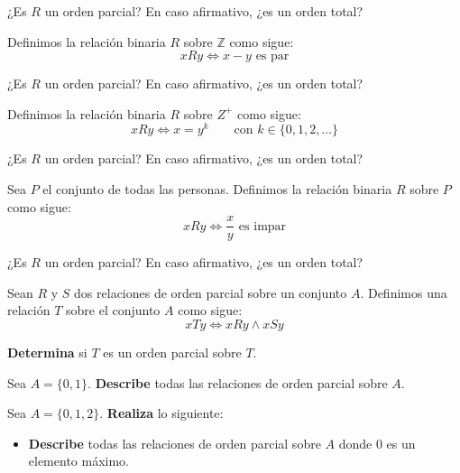 \documentclass[oneside]{style}
\begin{document}
\begin{questions}[label=\protect\circled{\bfseries\arabic*}]
{        ¿Es $R$ un orden parcial? En caso afirmativo, ¿es un orden total?
    }

    \question
    {
        Definimos la relación binaria $R$ sobre $\mathbb{Z}$ como sigue:
        \begin{equation*}
            xRy \Leftrightarrow x-y \text{ es par}
        \end{equation*}

        ¿Es $R$ un orden parcial? En caso afirmativo, ¿es un orden total?
    }

    \question
    {
        Definimos la relación binaria $R$ sobre $Z^+$ como sigue:
        \begin{equation*}
            xRy \Leftrightarrow x = y^k \quad \quad \text{con }
            k \in \{0,1,2,\ldots\}
        \end{equation*}

        ¿Es $R$ un orden parcial? En caso afirmativo, ¿es un orden total?
    }

    \question
    {
        Sea $P$ el conjunto de todas las personas. Definimos la relación 
        binaria $R$ sobre $P$ como  sigue:
        \begin{equation*}
            xRy \Leftrightarrow \frac{x}{y} \text{ es impar}
        \end{equation*}

        ¿Es $R$ un orden parcial? En caso afirmativo, ¿es un orden total?
    }

    \question
    {
        Sean $R$ y $S$ dos relaciones de orden parcial sobre un conjunto $A$.
        Definimos una relación $T$ sobre el conjunto $A$ como sigue:
        \begin{equation*}
            xTy \Leftrightarrow xRy \land xSy 
        \end{equation*} 

        \textbf{Determina} si $T$ es un orden parcial sobre $T$. 
    }

    \question
    {
        Sea $A = \{0,1\}$. \textbf{Describe} todas las relaciones de orden 
        parcial sobre $A$. 
    }

    \question 
    {
        Sea $A = \{0,1,2\}$. \textbf{Realiza} lo siguiente:
        \begin{itemize}
            \item \textbf{Describe} todas las relaciones de orden parcial sobre 
            $A$ donde $0$ es un elemento máximo. 


\end{itemize}}
\end{questions}
\end{document}
